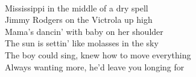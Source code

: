 \\
Mississippi in the middle of a dry spell \\
Jimmy Rodgers on the Victrola up high \\
Mama's dancin' with baby on her shoulder \\
The sun is settin' like molasses in the sky \\
The boy could sing, knew how to move everything \\
Always wanting more, he'd leave you longing for \\
